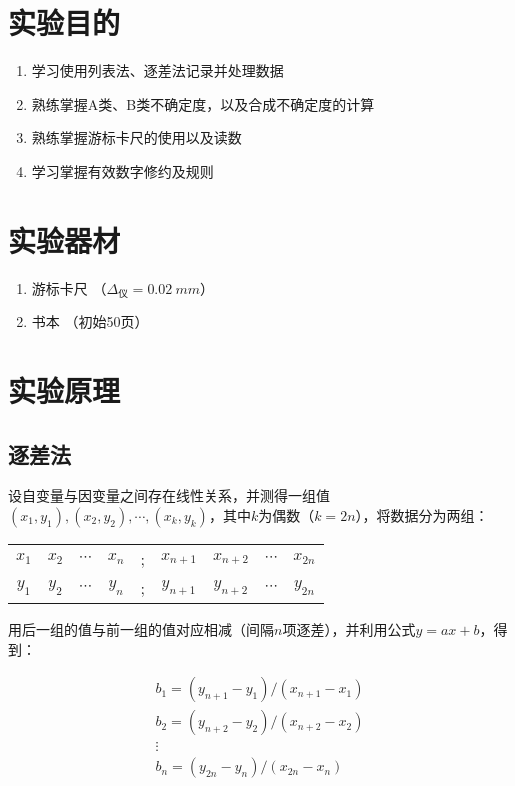 \documentclass{jiwu}
\begin{document}
\maketitle
\thispagestyle{firstpage}
\section{实验目的}
\begin{enumerate}
    \item 学习使用列表法、逐差法记录并处理数据
    \item 熟练掌握A类、B类不确定度，以及合成不确定度的计算
    \item 熟练掌握游标卡尺的使用以及读数
    \item 学习掌握有效数字修约及规则
\end{enumerate}
\section{实验器材}
\begin{enumerate}
    \item 游标卡尺 （$\Delta_{仪}=\SI{0.02}{mm}$）
    \item 书本 （初始50页）
\end{enumerate}
\section{实验原理}
    \subsection{逐差法}
    设自变量与因变量之间存在线性关系，并测得一组值 $(x_1,y_1),(x_2,y_2),\cdots,(x_k,y_k)$，其中$k$为偶数（$k=2n$），将数据分为两组：

    \begin{tabular}{*{9}{c}}
        $x_1$&$x_2$&$\cdots$&$x_n$&;&$x_{n+1}$&$x_{n+2}$&$\cdots$&$x_{2n}$\\
        $y_1$&$y_2$&$\cdots$&$y_n$&;&$y_{n+1}$&$y_{n+2}$&$\cdots$&$y_{2n}$\\
    \end{tabular}

    用后一组的值与前一组的值对应相减（间隔$n$项逐差），并利用公式$y=ax+b$，得到：

    $$
        \begin{array}{l}
            b_1=(y_{n+1}-y_1)/(x_{n+1}-x_1)\\
            b_2=(y_{n+2}-y_2)/(x_{n+2}-x_2)\\
            \vdots\\
            b_n=(y_{2n}-y_n)/(x_{2n}-x_n)
        \end{array}
    $$\par
\end{document}
